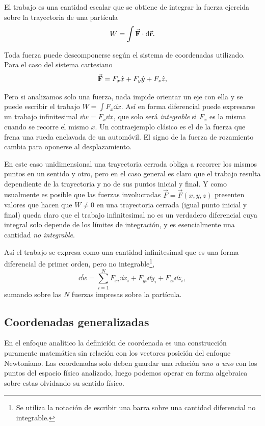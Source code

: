 \documentclass[12pt, spanish, a4paper, ]{article}
\begin{document}
El trabajo es una cantidad escalar que se obtiene de integrar la fuerza ejercida sobre la trayectoria de una partícula
\begin{equation}
	W= \int \va{F} \cdot \dd\va{r}.
\end{equation}

Toda fuerza puede descomponerse según el sistema de coordenadas utilizado.
Para el caso del sistema cartesiano
\begin{equation}
	\va{F}= F_x \hat{x}+ F_y \hat{y}+ F_z \hat{z},
\end{equation}

Pero si analizamos solo una fuerza, nada impide orientar un eje con ella y se puede escribir el trabajo \(W= \int F_x \dd x\).
Así en forma diferencial puede expresarse un trabajo infinitesimal \(\dd w= F_x \dd x\), que solo será \emph{integrable} si \(F_x\) es la misma cuando se recorre el mismo \(x\).
Un contraejemplo clásico es el de la fuerza que frena una rueda enclavada de un automóvil.
El signo de la fuerza de rozamiento cambia para oponerse al desplazamiento.

En este caso unidimensional una trayectoria cerrada obliga a recorrer los mismos puntos en un sentido y otro, pero en el caso general es claro que el trabajo resulta dependiente de la trayectoria y no de sus puntos inicial y final.
Y como usualmente es posible que las fuerzas involucradas \(\vec{F}= \vec{F}(x,y,z)\) presenten valores que hacen que \(W \neq 0 \) en una trayectoria cerrada (igual punto inicial y final) queda claro que el trabajo infinitesimal no es un verdadero diferencial cuya integral solo depende de los límites de integración, y es esencialmente una cantidad \emph{no integrable}.

Así el trabajo se expresa como una cantidad infinitesimal que es una forma diferencial de primer orden, pero no integrable\footnote{Se utiliza la notación de escribir una barra sobre una cantidad diferencial no integrable.}, 
\begin{equation}\label{Lanczos17.2}
	\overline{\dd w}= \displaystyle\sum_{i=1}^{N} F_{xi} \dd x_i+ F_{yi} \dd y_i+ F_{zi} \dd z_i,
	\tag{Lanczos 17.2}
\end{equation}
sumando sobre las \(N\) fuerzas impresas sobre la partícula.


\subsection{Coordenadas generalizadas}\label{generalizadas}
En el enfoque analítico la definición de coordenada es una construcción puramente matemática sin relación con los vectores posición del enfoque Newtoniano.
Las coordenadas solo deben guardar una relación \emph{uno a uno} con los puntos del espacio físico analizado, luego podemos operar en forma algebraica sobre estas olvidando su sentido físico.
\end{document}
